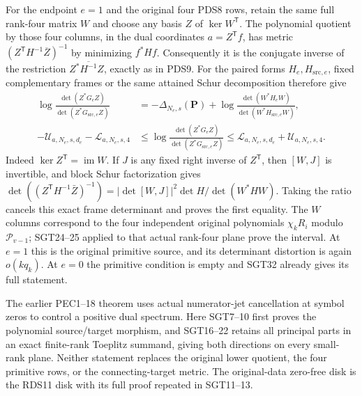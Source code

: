 \documentclass[11pt,a4paper]{article}
\begin{document}
For the endpoint $e=1$ and the original four PDS8 rows, retain the same full rank-four
matrix $W$ and choose any basis $Z$ of $\ker W^{\mathsf T}$.
The polynomial quotient by those four columns, in the dual coordinates
$a=Z^{\mathsf T}f$, has metric
$(Z^{\mathsf T}H^{-1}\overline Z)^{-1}$ by minimizing $f^*Hf$.
Consequently it is the conjugate inverse of the restriction
$Z^*\overline{H^{-1}}Z$, exactly as in PDS9. For the paired
forms $H_e,H_{\mathrm{src},e}$, fixed complementary frames or the
same attained Schur decomposition therefore give
\[
\begin{split}
 \log\frac{\det(Z^*G_eZ)}
              {\det(Z^*G_{\mathrm{src},e}Z)}
 &=-\Delta_{N_e,s}(\mathbf P)
   +\log\frac{\det(W^*H_eW)}
                   {\det(W^*H_{\mathrm{src},e}W)},\\
 -\mathcal U_{a,N_e,s,d_e}-\mathcal L_{a,N_e,s,4}
 &\le \log\frac{\det(Z^*G_eZ)}
                   {\det(Z^*G_{\mathrm{src},e}Z)}
 \le\mathcal L_{a,N_e,s,d_e}+\mathcal U_{a,N_e,s,4}.
\end{split}\tag{SGT33}
\]
Indeed $\ker Z^{\mathsf T}=\operatorname{im}W$. If $J$ is any
fixed right inverse of $Z^{\mathsf T}$, then $[W,J]$ is invertible,
and block Schur factorization gives
$\det((Z^{\mathsf T}H^{-1}\bar Z)^{-1})
 =|\det[W,J]|^2\det H/\det(W^*HW)$.
Taking the ratio cancels this exact frame determinant and proves
the first equality. The $W$ columns correspond to the four independent
original polynomials $\chi_kR_i$ modulo $\mathcal P_{v-1}$;
SGT24--25 applied to that actual rank-four plane prove the interval.
At $e=1$ this is the original primitive source, and its determinant
distortion is again $o(kq_k)$. At $e=0$ the primitive condition is
empty and SGT32 already gives its full statement.

The earlier PEC1--18 theorem uses actual numerator-jet cancellation
at symbol zeros to control a positive dual spectrum. Here SGT7--10
first proves the polynomial source/target morphism, and SGT16--22
retains all principal parts in an exact finite-rank Toeplitz summand,
giving both directions on every small-rank plane. Neither statement
replaces the original lower quotient, the four primitive rows, or the
connecting-target metric. The original-data zero-free disk is the
RDS11 disk with its full proof repeated in SGT11--13.

\endgroup
\label{MTBUILD:SGT_COMPLETE_PREREQUISITE:end}

\clearpage
\label{MTBUILD:CPQ_COMPLETE_PREREQUISITE:start}
\clearpage
\begingroup
\providecommand{\im}{\operatorname{im}}
\providecommand{\rank}{\operatorname{rank}}
\end{document}
